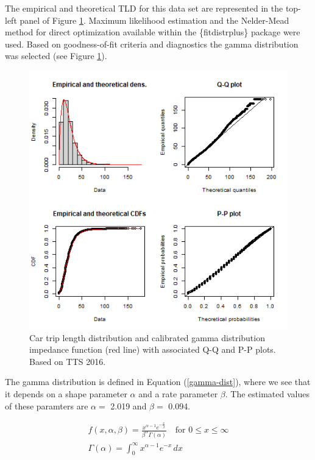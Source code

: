 \documentclass[]{elsarticle} %
\begin{document}
The empirical and theoretical TLD for this data set are represented in
the top-left panel of Figure \ref{fig:TLD-Gamma-plot}. Maximum
likelihood estimation and the Nelder-Mead method for direct optimization
available within the \{fitdistrplus\} package \citep{fitdistrplus_2015}
were used. Based on goodness-of-fit criteria and diagnostics the gamma
distribution was selected (see Figure \ref{fig:TLD-Gamma-plot}).

\begin{figure}

{\centering \includegraphics[width=0.8\linewidth]{images/impedance_function} 

}

\caption{\label{fig:TLD-Gamma-plot}Car trip length distribution and calibrated gamma distribution impedance function (red line) with associated Q-Q and P-P plots. Based on TTS 2016.}\label{fig:TLD-Gamma-plot}
\end{figure}

The gamma distribution is defined in Equation (\ref{gamma-dist}), where
we see that it depends on a shape parameter \(\alpha\) and a rate
parameter \(\beta\). The estimated values of these paramters are
\(\alpha=\) 2.019 and \(\beta =\) 0.094.

\begin{equation}
\label{gamma-dist}
\begin{array}{l} 
f(x, \alpha, \beta) = \frac {x^{\alpha-1}e^{-\frac{x}{\beta}}}{ \beta^{\alpha}\Gamma(\alpha)} \quad \text{for } 0 \leq x \leq \infty\\

\Gamma(\alpha) =  \int_{0}^{\infty} x^{\alpha-1}e^{-x} \,dx\\
\end{array}
\end{equation}
\end{document}
